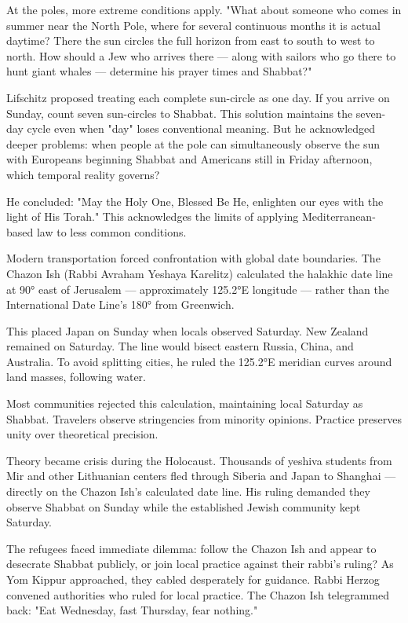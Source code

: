 At the poles, more extreme conditions apply. "What about someone who comes in summer near the North Pole, where for several continuous months it is actual daytime? There the sun circles the full horizon from east to south to west to north. How should a Jew who arrives there — along with sailors who go there to hunt giant whales — determine his prayer times and Shabbat?"

Lifschitz proposed treating each complete sun-circle as one day. If you arrive on Sunday, count seven sun-circles to Shabbat. This solution maintains the seven-day cycle even when "day" loses conventional meaning. But he acknowledged deeper problems: when people at the pole can simultaneously observe the sun with Europeans beginning Shabbat and Americans still in Friday afternoon, which temporal reality governs?

He concluded: "May the Holy One, Blessed Be He, enlighten our eyes with the light of His Torah." This acknowledges the limits of applying Mediterranean-based law to less common conditions.

Modern transportation forced confrontation with global date boundaries. The Chazon Ish (Rabbi Avraham Yeshaya Karelitz) calculated the halakhic date line at 90° east of Jerusalem — approximately 125.2°E longitude — rather than the International Date Line's 180° from Greenwich.

This placed Japan on Sunday when locals observed Saturday. New Zealand remained on Saturday. The line would bisect eastern Russia, China, and Australia. To avoid splitting cities, he ruled the 125.2°E meridian curves around land masses, following water.

Most communities rejected this calculation, maintaining local Saturday as Shabbat. Travelers observe stringencies from minority opinions. Practice preserves unity over theoretical precision.

Theory became crisis during the Holocaust. Thousands of yeshiva students from Mir and other Lithuanian centers fled through Siberia and Japan to Shanghai — directly on the Chazon Ish's calculated date line. His ruling demanded they observe Shabbat on Sunday while the established Jewish community kept Saturday.

The refugees faced immediate dilemma: follow the Chazon Ish and appear to desecrate Shabbat publicly, or join local practice against their rabbi's ruling? As Yom Kippur approached, they cabled desperately for guidance. Rabbi Herzog convened authorities who ruled for local practice. The Chazon Ish telegrammed back: "Eat Wednesday, fast Thursday, fear nothing."

